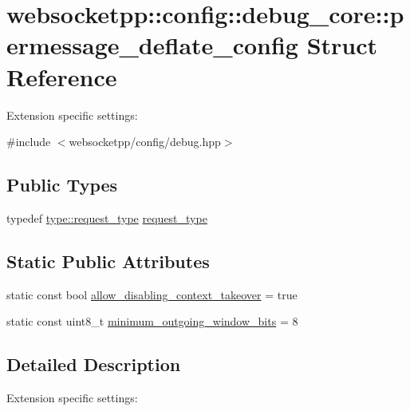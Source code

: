 \hypertarget{structwebsocketpp_1_1config_1_1debug__core_1_1permessage__deflate__config}{}\section{websocketpp\+:\+:config\+:\+:debug\+\_\+core\+:\+:permessage\+\_\+deflate\+\_\+config Struct Reference}
\label{structwebsocketpp_1_1config_1_1debug__core_1_1permessage__deflate__config}


Extension specific settings\+:  




{\ttfamily \#include $<$websocketpp/config/debug.\+hpp$>$}

\subsection*{Public Types}
\begin{DoxyCompactItemize}
\item 
typedef \hyperlink{structwebsocketpp_1_1config_1_1debug__core_a597de872d5a5b6e9bd2fa1af18ccbbc6}{type\+::request\+\_\+type} \hyperlink{structwebsocketpp_1_1config_1_1debug__core_1_1permessage__deflate__config_aaf933a304bf66b1bdf5bec33fdf013a8}{request\+\_\+type}
\end{DoxyCompactItemize}
\subsection*{Static Public Attributes}
\begin{DoxyCompactItemize}
\item 
static const bool \hyperlink{structwebsocketpp_1_1config_1_1debug__core_1_1permessage__deflate__config_a2c214b49d880b8ca1ebcce9c92d1dec6}{allow\+\_\+disabling\+\_\+context\+\_\+takeover} = true
\item 
static const uint8\+\_\+t \hyperlink{structwebsocketpp_1_1config_1_1debug__core_1_1permessage__deflate__config_ae9ce7b9a7a002339d80dca046e940867}{minimum\+\_\+outgoing\+\_\+window\+\_\+bits} = 8
\end{DoxyCompactItemize}


\subsection{Detailed Description}
Extension specific settings\+: 

